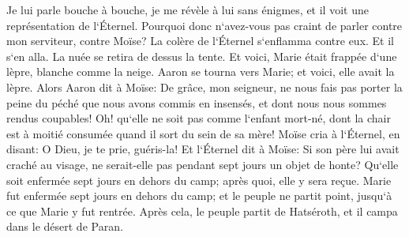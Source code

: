 \verse Je lui parle bouche à bouche, je me révèle à lui sans énigmes, et il voit une représentation de l`Éternel. Pourquoi donc n`avez-vous pas craint de parler contre mon serviteur, contre Moïse? 
\verse La colère de l`Éternel s`enflamma contre eux. Et il s`en alla. 
\verse La nuée se retira de dessus la tente. Et voici, Marie était frappée d`une lèpre, blanche comme la neige. Aaron se tourna vers Marie; et voici, elle avait la lèpre. 
\verse Alors Aaron dit à Moïse: De grâce, mon seigneur, ne nous fais pas porter la peine du péché que nous avons commis en insensés, et dont nous nous sommes rendus coupables! 
\verse Oh! qu`elle ne soit pas comme l`enfant mort-né, dont la chair est à moitié consumée quand il sort du sein de sa mère! 
\verse Moïse cria à l`Éternel, en disant: O Dieu, je te prie, guéris-la! 
\verse Et l`Éternel dit à Moïse: Si son père lui avait craché au visage, ne serait-elle pas pendant sept jours un objet de honte? Qu`elle soit enfermée sept jours en dehors du camp; après quoi, elle y sera reçue. 
\verse Marie fut enfermée sept jours en dehors du camp; et le peuple ne partit point, jusqu`à ce que Marie y fut rentrée. 
\verse Après cela, le peuple partit de Hatséroth, et il campa dans le désert de Paran. 

\chapter{}

